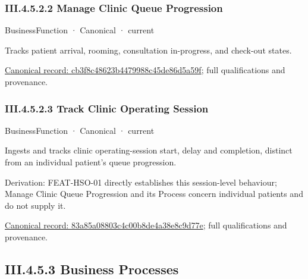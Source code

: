 \subsubsection*{III.4.5.2.2 Manage Clinic Queue Progression}
\label{navigation:III.4.5.2.2}

\label{element:cb3f8c48623b4479988c45de86d5a59f}
{\small BusinessFunction · Canonical · current}\par

Tracks patient arrival, rooming, consultation in-progress, and check-out states.


{\footnotesize \href{../../../../continuum/business/business-function/cb3f8c48623b4479988c45de86d5a59f.md}{Canonical record: cb3f8c48623b4479988c45de86d5a59f}; full qualifications and provenance.}\par
\subsubsection*{III.4.5.2.3 Track Clinic Operating Session}
\label{navigation:III.4.5.2.3}

\label{element:83a85a08803c4c00b8de4a38e8c9d77e}
{\small BusinessFunction · Canonical · current}\par

Ingests and tracks clinic operating-session start, delay and completion, distinct from an individual patient's queue progression.



Derivation: FEAT-HSO-01 directly establishes this session-level behaviour; Manage Clinic Queue Progression and its Process concern individual patients and do not supply it.


{\footnotesize \href{../../../../continuum/business/business-function/83a85a08803c4c00b8de4a38e8c9d77e.md}{Canonical record: 83a85a08803c4c00b8de4a38e8c9d77e}; full qualifications and provenance.}\par
\subsection*{III.4.5.3 Business Processes}
\label{navigation:III.4.5.3}

